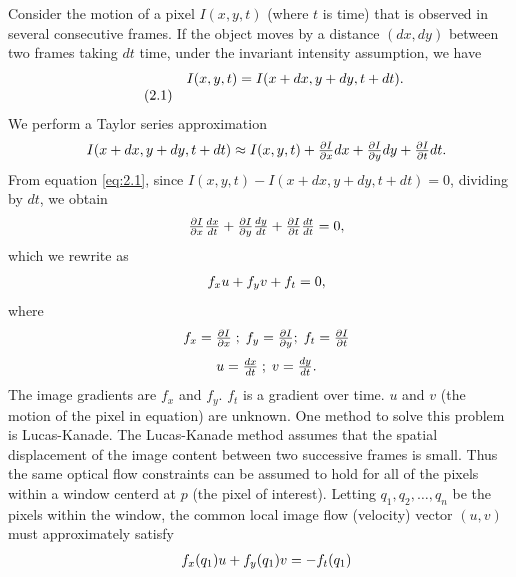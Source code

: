 Consider the motion of a pixel $I(x,y,t)$ (where $t$ is time) that is observed in several consecutive frames. If the object moves by a distance $(dx,dy)$ between two frames taking $dt$ time, under the invariant intensity assumption, we have
\[
\begin{array}{lc}
  {\rm } & {I(x,y,t)} = I(x+dx,y+dy,t+dt). \\ \tag{2.1} \label{eq:2.1}
\end{array}
\]
We perform a Taylor series approximation
\[
\begin{array}{lc}
  {\rm } & {I(x+dx,y+dy,t+dt) \approx I(x,y,t) + \frac{\partial I}{\partial x}dx+\frac{\partial I}{\partial y}d y+\frac{\partial I}{\partial t}dt}.\\ 
\end{array}
\]
From equation \eqref{eq:2.1}, since ${I(x,y,t)} - I(x+dx,y+dy,t+dt) = 0$, dividing by $dt$, we obtain
\[
\begin{array}{lc}
  {\rm } & {\frac{\partial I}{\partial x}\frac{dx}{dt}+\frac{\partial I}{\partial y}\frac{d y}{d t}+\frac{\partial I}{\partial t}\frac{dt}{dt} = 0},\\ 
\end{array}
\]
which we rewrite as
\[
\begin{array}{lc}
  {\rm } & {f_xu + f_yv+ f_t }= 0, \\ 
\end{array}
\]
where
\[
\begin{array}{lc}
  {\rm } & {f_x = \frac{\partial I}{\partial x} \; ; \; f_y = \frac{\partial I}{\partial y} ; \; f_t = \frac{\partial I}{\partial t}}\\ 
\end{array}
\]
\[
\begin{array}{lc}
  {\rm } & {u = \frac{dx}{dt} \; ; \; v = \frac{dy}{dt}.}\\ 
\end{array}
\]
The image gradients are $ f_x $ and $ f_y $. $ f_t $ is a gradient over time. $u$ and $v$ (the motion of the pixel in equation) are unknown. One method to solve this problem is Lucas-Kanade. The Lucas-Kanade method assumes that the spatial displacement of the image content between two successive frames is small. Thus the same optical flow constraints can be assumed to hold for all of the pixels within a window centerd at $p$ (the pixel of interest). Letting $q_1, q_2, \hdots ,q_n$ be the pixels within the window, the common local image flow (velocity) vector $(u,v)$ must approximately satisfy
 \[
 \begin{array}{lc}
 {\rm } & {f_x(q_1)u + f_y(q_1)v} = - f_t(q_1) \\ 
 \end{array}
 \]

